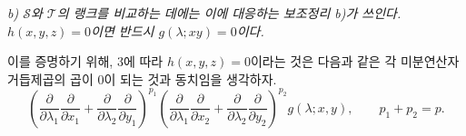 
\emph{b) $\mathcal S$와 $\mathcal T$의 랭크를 비교하는 데에는 이에 대응하는 보조정리 b)가 쓰인다. $h(x,y,z)=0$이면 반드시 $g(\lambda;xy)=0$이다.}

이를 증명하기 위해, 3에 따라 $h(x,y,z)=0$이라는 것은 다음과 같은 각 미분연산자 거듭제곱의 곱이 0이 되는 것과 동치임을 생각하자.
\[
 \left(\frac{\partial}{\partial\lambda_1}\frac{\partial}{\partial x_1}
 +\frac{\partial}{\partial\lambda_2}\frac{\partial}{\partial y_1}\right)^{p_1}
 \left(\frac{\partial}{\partial\lambda_1}\frac{\partial}{\partial x_2}
 +\frac{\partial}{\partial\lambda_2}\frac{\partial}{\partial y_2}\right)^{p_2}g(\lambda;x,y),
 \qquad p_1+p_2=p.
\]
